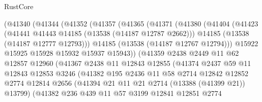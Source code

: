 \begin{lexlean}{RustCore}
\begin{coremodule}
                    (@41340
                      (@41344
                        (@41352
                          (@41357
                            (@41365
                              (@41371
                                (@41380
                                  (@41404
                                    (@41423
                                      (@41441 @41443 @14185 (@13538 (@14187 @12787 @2662)))
                                      @14185
                                      (@13538 (@14187 @12777 @12793)))
                                    @14185
                                    (@13538 (@14187 @12767 @12794)))
                                  @15922
                                  @15925
                                  @15928
                                  @15932
                                  @15937
                                  @15943))
                              (@41359
                                @2438
                                @2449
                                @11
                                @62
                                @12857
                                @12960
                                (@41367
                                  @2438
                                  @11
                                  @12843
                                  @12855
                                  (@41374
                                    @2437
                                    @59
                                    @11
                                    @12843
                                    @12853
                                    @3246
                                    (@41382
                                      @195
                                      @2436
                                      @11
                                      @58
                                      @2714
                                      @12842
                                      @12852
                                      @2774
                                      @12814
                                      @2656
                                      (@41394 @21 @11 @21 @2714 (@13388 (@41399 @21)) @13799)
                                      (@41382
                                        @236
                                        @439
                                        @11
                                        @57
                                        @3199
                                        @12841
                                        @12851
                                        @2774

\end{coremodule}
\end{lexlean}
